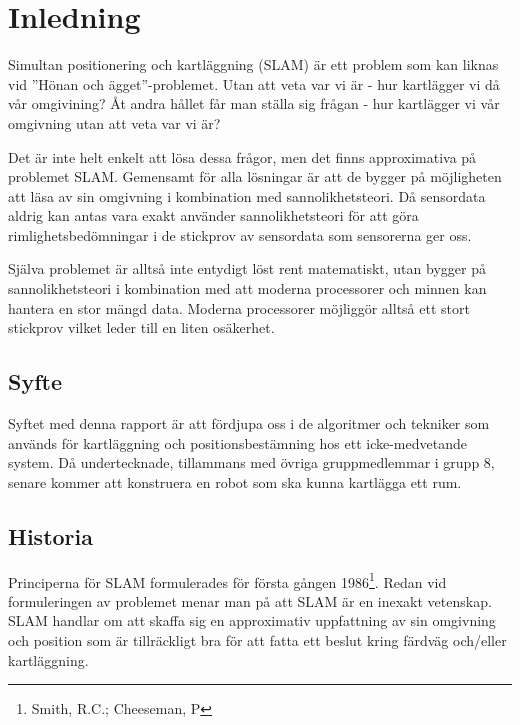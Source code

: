 \documentclass[a4paper,12pt,fleqn]{article}
\begin{document}
\addto\captionsswedish{\renewcommand{\contentsname}{Innehållsförteckning}}

\tableofcontents
\thispagestyle{fancy}
\newpage

\section{Inledning}

Simultan positionering och kartläggning (SLAM) är ett problem som kan liknas vid ''Hönan och ägget''-problemet. Utan att veta var vi är - hur kartlägger vi då vår omgivining? Åt andra hållet får man ställa sig frågan - hur kartlägger vi vår omgivning utan att veta var vi är? 

Det är inte helt enkelt att lösa dessa frågor, men det finns
approximativa på problemet SLAM. Gemensamt för alla lösningar är att de
bygger på möjligheten att läsa av sin omgivning i kombination med
sannolikhetsteori. Då sensordata aldrig kan antas vara exakt använder
sannolikhetsteori för att göra rimlighetsbedömningar i de stickprov av
sensordata som sensorerna ger oss.

Själva problemet är alltså inte entydigt löst rent matematiskt, utan
bygger på sannolikhetsteori i kombination med att moderna processorer
och minnen kan hantera en stor mängd data. Moderna processorer möjliggör
alltså ett stort stickprov vilket leder till en liten osäkerhet.

\subsection{Syfte}
Syftet med denna rapport är att fördjupa oss i de algoritmer och tekniker som används för kartläggning och positionsbestämning hos ett icke-medvetande system. Då undertecknade, tillammans med övriga gruppmedlemmar i grupp 8, senare kommer att konstruera en robot som ska kunna kartlägga ett rum. 

\subsection{Historia}

Principerna för SLAM formulerades för första gången 1986\footnote{Smith, R.C.; Cheeseman, P}. Redan vid formuleringen av problemet menar man på att SLAM är en inexakt vetenskap. SLAM handlar om att skaffa sig en approximativ uppfattning av sin omgivning och position som är tillräckligt bra för att fatta ett beslut kring färdväg och/eller kartläggning. 
\end{document}
